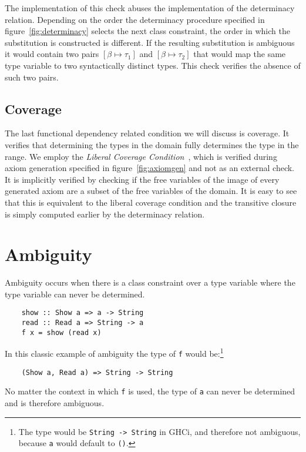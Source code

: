 The implementation of this check abuses the implementation of the determinacy
relation. Depending on the order the determinacy procedure specified in
figure~\ref{fig:determinacy} selects the next class constraint, the order in
which the substitution is constructed is different. If the resulting
substitution is ambiguous it would contain two pairs $[\beta \mapsto \tau_1]$
and $[\beta \mapsto \tau_2]$ that would map the same type variable to two
syntactically distinct types. This check verifies the absence of such two pairs.


\subsection{Coverage}
\label{sec:coverage}

The last functional dependency related condition we will discuss is coverage.
It verifies that determining the types in the domain fully determines the type
in the range. We employ the \textit{Liberal Coverage Condition}~\cite[Def.~15]{fundeps-chrs}, which is verified during axiom generation specified in
figure~\ref{fig:axiomgen} and not as an external check. It is implicitly
verified by checking if the free variables of the image of every generated axiom are
a subset of the free variables of the domain. It is easy to see that this is
equivalent to the liberal coverage condition and the transitive closure
is simply computed earlier by the determinacy relation.



\section{Ambiguity}

Ambiguity occurs when there is a class constraint over a type variable where the
type variable can never be determined.

\begin{verbatim}
    show :: Show a => a -> String
    read :: Read a => String -> a
    f x = show (read x)
\end{verbatim}

In this classic example of ambiguity the type of \texttt{f} would
be:\footnote{The type would be \texttt{String -> String} in GHCi, and therefore
not ambiguous, because \texttt{a} would default to \texttt{()}.}
\begin{verbatim}
    (Show a, Read a) => String -> String
\end{verbatim}
No matter the context in which \texttt{f} is used, the type of \texttt{a} can
never be determined and is therefore ambiguous.

